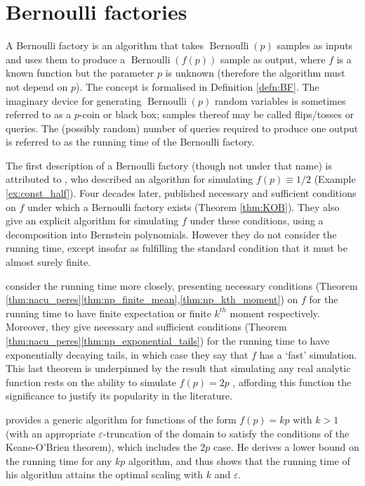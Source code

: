 \documentclass{article}
\theoremstyle{definition}
\newcommand{\Bern}{\operatorname{Bernoulli}}
\begin{document}
\section{Bernoulli factories}\label{sec:BFs}
A Bernoulli factory is an algorithm that takes $\Bern(p)$ samples as inputs and uses them to produce a $\Bern(f(p))$ sample as output, where $f$ is a known function but the parameter $p$ is unknown (therefore the algorithm must not depend on $p$). The concept is formalised in Definition \ref{defn:BF}.
The imaginary device for generating $\Bern(p)$ random variables is sometimes referred to as a $p$-coin or black box; samples thereof may be called flips/tosses or queries.
The (possibly random) number of queries required to produce one output is referred to as the running time of the Bernoulli factory.

The first description of a Bernoulli factory (though not under that name) is attributed to \citet{vonneumann1951}, who described an algorithm for simulating $f(p)\equiv 1/2$ (Example \ref{ex:const_half}).
Four decades later, \citet{keane1994} published necessary and sufficient conditions on $f$ under which a Bernoulli factory exists (Theorem \ref{thm:KOB}). They also give an explicit algorithm for simulating $f$ under these conditions, using a decomposition into Bernstein polynomials. However they do not consider the running time, except insofar as fulfilling the standard condition that it must be almost surely finite.

\citet{nacu2005} consider the running time more closely, presenting necessary conditions (Theorem \ref{thm:nacu_peres}\ref{thm:np_finite_mean},\ref{thm:np_kth_moment}) on $f$ for the running time to have finite expectation or finite $k^{th}$ moment respectively. Moreover, they give necessary and sufficient conditions (Theorem \ref{thm:nacu_peres}\ref{thm:np_exponential_tails}) for the running time to have exponentially decaying tails, in which case they say that $f$ has a `fast' simulation.
This last theorem is underpinned by the result that simulating any real analytic function rests on the ability to simulate $f(p)=2p$ \citep[Proposition 14(iii)]{nacu2005}, affording this function the significance to justify its popularity in the literature.

\citet{huber2016} provides a generic algorithm for functions of the form $f(p)=kp$ with $k>1$ (with an appropriate $\varepsilon$-truncation of the domain to satisfy the conditions of the Keane-O'Brien theorem), which includes the $2p$ case. He derives a lower bound on the running time for any $kp$ algorithm, and thus shows that the running time of his algorithm attains the optimal scaling with $k$ and $\varepsilon$.
\end{document}

